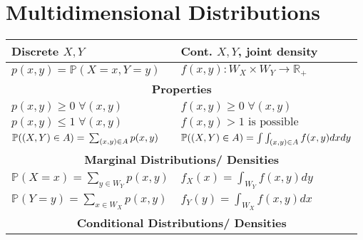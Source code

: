 \section{Multidimensional Distributions}
\renewcommand{\arraystretch}{1.3}
\setlength{\oldtabcolsep}{\tabcolsep}\setlength\tabcolsep{2pt}

{\small %
    \begin{tabularx}{\linewidth}{p{.5\linewidth} p{.5\linewidth}}
        \textbf{Discrete} $X, Y$                                                          & \textbf{Cont}. $X, Y$, \textbf{joint density}                            \\
        \toprule
        $p(x,y)=\mathbb{P}(X=x,Y=y)$                                                      & $f(x,y)\colon W_X\times W_Y\to\mathbb{R_+}$                              \\
        \multicolumn{2}{c}{\textbf{Properties}}                                                                                                                      \\
        $p(x,y)\ge0\;\forall(x,y)$                                                        & $f(x,y)\geq0\;\forall(x,y)$                                              \\
        $p(x,y)\le1\;\forall(x,y)$                                                        & $f(x,y)>1\text{ is possible}$                                            \\
        $\mathbb{P}((X,Y)\in A)=\newline\sum_{(x,y)\in A}p(x,y)$                          & $\mathbb{P}((X,Y)\in A)\newline=\int\int_{(x,y)\in A}f(x,y)dxdy$         \\
        \multicolumn{2}{c}{\textbf{Marginal Distributions/ Densities}}                                                                                               \\
        $\mathbb P(X=x)=\sum_{y\in W_Y}p(x,y)$                                            & $f_X(x)=\int_{W_Y}f(x,y)dy$                                              \\
        $\mathbb P(Y=y)=\sum_{x\in W_X}p(x,y)$                                            & $f_Y(y)=\int_{W_X}f(x,y)dx$                                              \\
        \multicolumn{2}{c}{\textbf{Conditional Distributions/ Densities}}                                                                                            \\

\end{tabularx}}
